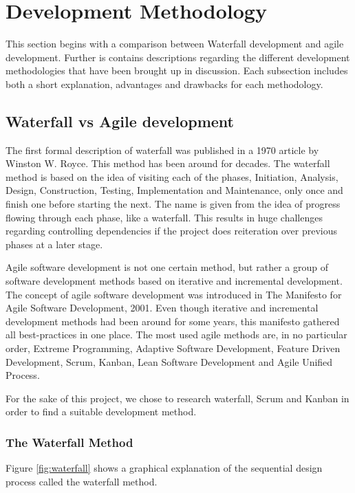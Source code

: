 \chapter{Development Methodology}
\label{chap:developmentMethodology}
This section begins with a comparison between Waterfall development and agile development. Further is contains descriptions regarding the different development methodologies that have been brought up in discussion. Each subsection
includes both a short explanation, advantages and drawbacks for each methodology.

\section{Waterfall vs Agile development}
The first formal description of waterfall was published in a 1970 article by Winston W. Royce\cite{waterfall}. This method has been around for decades. The waterfall method is 
based on the idea of visiting each of the phases, Initiation, Analysis, Design, Construction, Testing, Implementation and Maintenance, only once and finish one before starting the next. The name is given from the idea of progress flowing through 
each phase, like a waterfall. This results in huge challenges regarding controlling dependencies if the project does reiteration over previous phases at a later stage.

Agile software development is not one certain method, but rather a group of software development methods based on iterative and incremental development. The concept of agile software development was introduced in The Manifesto for Agile Software Development, 2001\cite{agilemanifesto}. Even though iterative and incremental development methods had been around for some years, this manifesto gathered all best-practices in one place. The most used agile methods are, in no particular order, Extreme Programming, Adaptive Software Development, Feature Driven Development, Scrum, Kanban, Lean Software Development and Agile Unified Process. 

For the sake of this project, we chose to research waterfall, Scrum and Kanban in order to find a suitable development method.

\subsection{The Waterfall Method}
Figure \ref{fig:waterfall} shows a graphical explanation of the sequential design process called the 
waterfall method.

